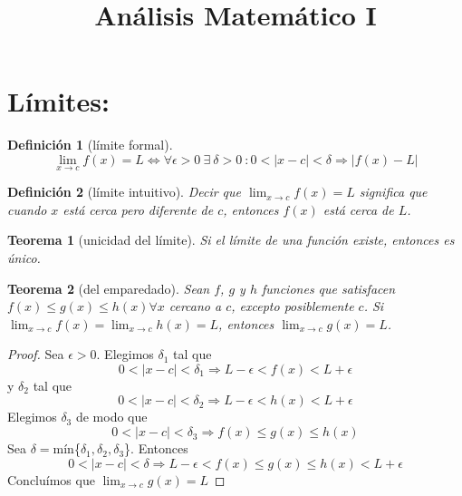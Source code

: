 \documentclass{article}
\title{Análisis Matemático I}
\date{}
\author{}
\newtheorem*{theorem}{Teorema}
\newtheorem*{definition}{Definición}
\begin{document}
  \maketitle
  \section*{Límites:} 
    \begin{definition}[límite formal]
      \begin{equation*}
        \lim_{x\to c}f(x)=L\iff\forall\epsilon>0 \ \exists\ \delta>0\ :0<|x-c|<\delta\Longrightarrow
        |f(x)-L| 
      \end{equation*}
    \end{definition}
    \begin{definition}[límite intuitivo]
      Decir que $\lim_{x\to c}f(x)=L$ significa  que cuando $x$ está cerca pero diferente de $c$,
      entonces $f(x)$ está cerca de $L$.
    \end{definition}
    \begin{theorem}[unicidad del límite]
      Si el límite de una función existe, entonces es único.
    \end{theorem}
    \begin{theorem}[del emparedado]
      Sean $f$, $g$ y $h$ funciones que satisfacen $f(x)\leqslant g(x)\leqslant h(x)\forall x$
      cercano a $c$, excepto posiblemente $c$. Si $\lim_{x\to c}f(x)=\lim_{x\to c}h(x)=L$, entonces
      $\lim_{x\to c}g(x)=L$.
    \end{theorem}
    \begin{proof}
      Sea $\epsilon>0$. Elegimos $\delta_1$ tal que
      \begin{equation*}
        0<|x-c|<\delta_1\Longrightarrow L-\epsilon<f(x)<L+\epsilon
      \end{equation*}
      y $\delta_2$ tal que
      \begin{equation*}
        0<|x-c|<\delta_2\Longrightarrow L-\epsilon<h(x)<L+\epsilon
      \end{equation*}
      Elegimos $\delta_3$ de modo que
      \begin{equation*}
        0<|x-c|<\delta_3\Longrightarrow f(x)\leqslant g(x)\leqslant h(x)
      \end{equation*}
      Sea $\delta=$mín\{$\delta_1,\delta_2,\delta_3$\}. Entonces
      \begin{equation*}
        0<|x-c|<\delta\Longrightarrow L-\epsilon<f(x)\leqslant g(x)\leqslant h(x)<L+\epsilon
      \end{equation*}
      Concluímos que $\lim_{x\to c}g(x)=L$
    \end{proof}
    \newpage
\end{document}
